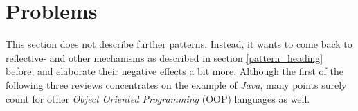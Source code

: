 %
%
%
%
%
%
%

\section{Problems}
\label{problems_heading}

This section does not describe further patterns. Instead, it wants to come back
to reflective- and other mechanisms as described in section \ref{pattern_heading}
before, and elaborate their negative effects a bit more. Although the first of
the following three reviews concentrates on the example of \emph{Java}, many
points surely count for other \emph{Object Oriented Programming} (OOP) languages
as well.





